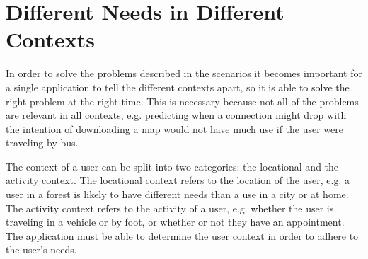 \section{Different Needs in Different Contexts}\label{sec:context}
In order to solve the problems described in the scenarios it becomes important for a single application to tell the different contexts apart, so it is able to solve the right problem at the right time. This is necessary because not all of the problems are relevant in all contexts, e.g. predicting when a connection might drop with the intention of downloading a map would not have much use if the user were traveling by bus.

The context of a user can be split into two categories: the locational and the activity context. The locational context refers to the location of the user, e.g. a user in a forest is likely to have different needs than a use in a city or at home. The activity context refers to the activity of a user, e.g. whether the user is traveling in a vehicle or by foot, or whether or not they have an appointment. The application must be able to determine the user context in order to adhere to the user's needs.